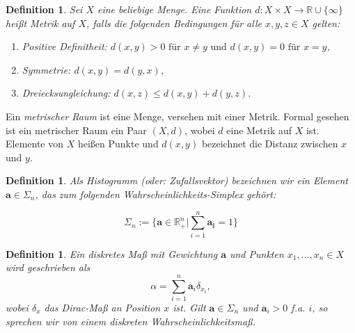 \documentclass[twoside, 12pt,a4paper]{book}
\def\emph#1{\textit{#1}}
\newtheorem{definition}[theorem]{Definition}
\numberwithin{equation}{section}
\begin{document}

	
	\begin{definition}\cite{burago2001course}
		Sei $X$ eine beliebige Menge. Eine Funktion $d:X \times X \to \mathbb{R} \cup \lbrace \infty \rbrace$ heißt \emph{Metrik} auf $X$, falls die folgenden Bedingungen für alle $x,y,z \in X$ gelten:
		\begin{enumerate}[label={(\arabic*)}]
			\item Positive Definitheit: $d(x,y) > 0 \text{ für } x \neq y \text{ und } d(x,y)=0 \text{ für } x=y$,
			\item Symmetrie: $d(x,y)=d(y,x)$,
			\item Dreiecksungleichung: $d(x,z) \leq d(x,y) + d(y,z)$.	
		\end{enumerate}
	\end{definition}
	\noindent Ein \emph{metrischer Raum} ist eine Menge, versehen mit einer Metrik. Formal gesehen ist ein metrischer Raum ein Paar $(X,d)$, wobei $d$ eine Metrik auf $X$ ist. Elemente von $X$ heißen Punkte und $d(x,y)$ bezeichnet die Distanz zwischen $x$ und $y$.
	
	
	\begin{definition}\cite{COTcuturi}
		Als Histogramm (oder: Zufallsvektor) bezeichnen wir ein Element $\boldsymbol{a} \in \Sigma_n$, das zum folgenden Wahrscheinlichkeits-Simplex gehört:
		
		\begin{equation*}
		\Sigma_n := \lbrace \boldsymbol{a} \in \mathbb{R}_{+}^n | \sum_{i=1}^n{\boldsymbol{a_i} = 1} \rbrace
		\end{equation*}
	\end{definition}
	
	\begin{definition}\cite{COTcuturi}
		Ein diskretes Maß mit Gewichtung $\boldsymbol{a}$ und Punkten $x_1,...,x_n \in X$ wird geschrieben als
		\begin{equation}
		\alpha = \sum_{i=1}^n{\boldsymbol{a}_i\delta_{x_i}},
		\end{equation}
		wobei $\delta_x$ das Dirac-Maß an Position $x$ ist. Gilt $\boldsymbol{a} \in \Sigma_n$ und $\boldsymbol{a}_i >0$ f.a. $i$, so sprechen wir von einem diskreten Wahrscheinlichkeitsmaß.
	\end{definition}
	
\end{document}
